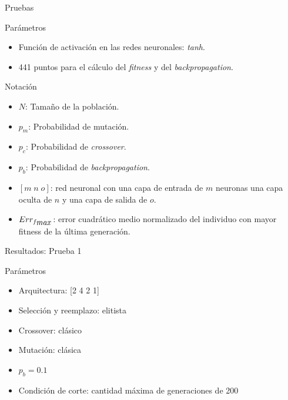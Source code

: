 \documentclass{beamer}
\begin{document}
\begin{frame}{Pruebas}
\begin{block}{Parámetros}
\begin{itemize}
 \item Función de activación en las redes neuronales: \emph{tanh}.
 \item 441 puntos para el cálculo del \emph{fitness} y del \emph{backpropagation}.
\end{itemize}
\end{block}

\begin{block}{Notación}
\begin{itemize}
 \item $N$: Tamaño de la población.
 \item $p_m$: Probabilidad de mutación.
 \item $p_c$: Probabilidad de \emph{crossover}.
 \item $p_b$: Probabilidad de \emph{backpropagation}.
 \item $[m \; n \; o]$: red neuronal con una capa de entrada de $m$ neuronas una capa oculta de $n$ y una capa de salida de $o$.
 \item $Err_{f_{\mbox{\emph{max}}}}$: error cuadrático medio normalizado del individuo con mayor fitness de la última generación.
\end{itemize}
\end{block}
\end{frame}

\begin{frame}{Resultados: Prueba 1}
\begin{block}{Parámetros}
\begin{itemize}
\item Arquitectura: [2 4 2 1]
\item Selección y reemplazo: elitista
\item Crossover: clásico
\item Mutación: clásica
\item $p_b = 0.1 $
\item Condición de corte: cantidad máxima de generaciones de 200
\end{itemize}
\end{block}
\end{frame}
\end{document}
